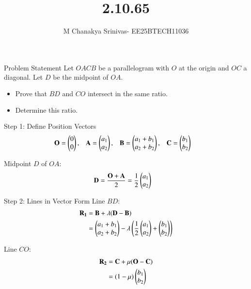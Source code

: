 \documentclass{beamer}
\title %
{2.10.65}
\date{}
\author %
{M Chanakya Srinivas- EE25BTECH11036}
\begin{document}
\frame{\titlepage}




\begin{frame}{Problem Statement}
Let $OACB$ be a parallelogram with $O$ at the origin and $OC$ a diagonal. Let $D$ be the midpoint of $OA$. 

\begin{itemize}
    \item Prove that $BD$ and $CO$ intersect in the same ratio.
    \item Determine this ratio.
\end{itemize}
\end{frame}

\begin{frame}{Step 1: Define Position Vectors}
\begin{align}
\mathbf{O} &= \begin{pmatrix}0\\0\end{pmatrix}, &
\mathbf{A} &= \begin{pmatrix}a_1\\a_2\end{pmatrix}, &
\mathbf{B} &= \begin{pmatrix}a_1 + b_1\\a_2 + b_2\end{pmatrix}, &
\mathbf{C} &= \begin{pmatrix}b_1\\b_2\end{pmatrix}
\end{align}

Midpoint $D$ of $OA$:
\begin{align}
\mathbf{D} &= \frac{\mathbf{O} + \mathbf{A}}{2} = \frac{1}{2} \begin{pmatrix}a_1\\a_2\end{pmatrix}
\end{align}
\end{frame}

\begin{frame}{Step 2: Lines in Vector Form}
Line $BD$:
\begin{align}
\mathbf{R_1} &= \mathbf{B} + \lambda (\mathbf{D} - \mathbf{B}) \notag \\
&= \begin{pmatrix}a_1 + b_1\\a_2 + b_2\end{pmatrix} - \lambda \left(\frac{1}{2} \begin{pmatrix}a_1\\a_2\end{pmatrix} + \begin{pmatrix}b_1\\b_2\end{pmatrix}\right)
\end{align}

Line $CO$:
\begin{align}
\mathbf{R_2} &= \mathbf{C} + \mu (\mathbf{O} - \mathbf{C}) \notag \\
&= (1 - \mu) \begin{pmatrix}b_1\\b_2\end{pmatrix}
\end{align}
\end{frame}
\end{document}
